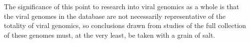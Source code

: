 \documentclass[12pt]{article}
\begin{document}
    The significance of this point to research into viral genomics as a whole is
    that the viral genomes in the database are not necessarily representative of
    the totality of viral genomics, so conclusions drawn from studies of the full
    collection of these genomes must, at the very least, be taken with a grain of
    salt.

    
\end{document}
